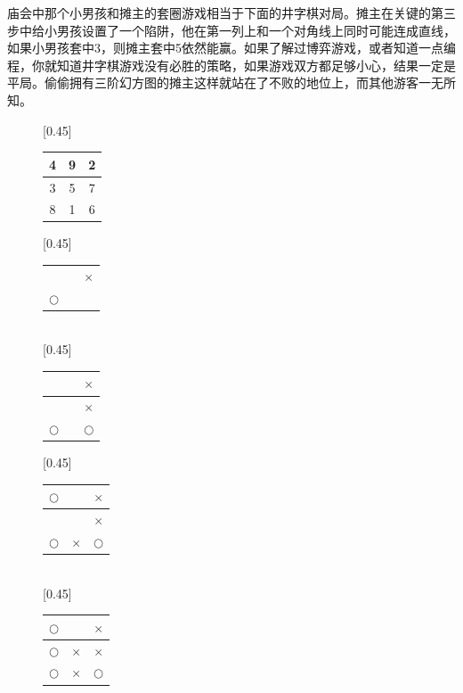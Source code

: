 \documentclass[UTF8]{article}
\begin{document}
庙会中那个小男孩和摊主的套圈游戏相当于下面的井字棋对局。摊主在关键的第三步中给小男孩设置了一个陷阱，他在第一列上和一个对角线上同时可能连成直线，如果小男孩套中3，则摊主套中5依然能赢。如果了解过博弈游戏，或者知道一点编程，你就知道井字棋游戏没有必胜的策略，如果游戏双方都足够小心，结果一定是平局。偷偷拥有三阶幻方图的摊主这样就站在了不败的地位上，而其他游客一无所知。

\begin{figure}[htbp]
 \centering
 [0.45\linewidth]{
   \begin{tabular}{|c|c|c|}
   \hline
   4 & 9 & 2 \\
   \hline
   3 & 5 & 7 \\
   \hline
   8 & 1 & 6 \\
   \hline
   \end{tabular}
   \vspace{3mm}
 }
 [0.45\linewidth]{
   \begin{tabular}{c|c|c}
   &  & \\
   \hline
   &  & $\times$ \\
   \hline
   $\bigcirc$ & & \\
   \end{tabular}
   \vspace{3mm}
 } \vspace{3mm} \\
 [0.45\linewidth]{
   \begin{tabular}{c|c|c}
   &  & $\times$\\
   \hline
   &  & $\times$ \\
   \hline
   $\bigcirc$ & & $\bigcirc$ \\
   \end{tabular}
   \vspace{3mm}
 }
 [0.45\linewidth]{
   \begin{tabular}{c|c|c}
   $\bigcirc$ &  & $\times$\\
   \hline
   &  & $\times$ \\
   \hline
   $\bigcirc$ & $\times$ & $\bigcirc$ \\
   \end{tabular}
   \vspace{3mm}
 } \vspace{3mm} \\
 [0.45\linewidth]{
   \begin{tabular}{c|c|c}
   $\pmb{\bigcirc}$ &  & $\times$\\
   \hline
   $\pmb{\bigcirc}$ &  $\times$ & $\times$ \\
   \hline
   $\pmb{\bigcirc}$ & $\times$ & $\bigcirc$ \\
   \end{tabular}
   \vspace{3mm}
 }
 \captionsetup{labelformat=empty}
 \caption{}
 \label{fig:game-steps}
\end{figure}
\end{document}
